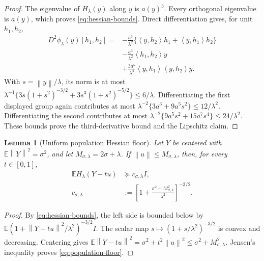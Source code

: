 \documentclass[twoside]{article}
\newtheorem{lemma}[theorem]{Lemma}
\theoremstyle{definition}
\newcommand{\E}{\mathbb E}
\newcommand{\norm}[1]{\left\lVert #1\right\rVert}
\newcommand{\ip}[2]{\left\langle #1,#2\right\rangle}
\begin{document}
\begin{proof}
The eigenvalue of $H_\lambda(y)$ along $y$ is $a(y)^3$. Every orthogonal eigenvalue is $a(y)$, which proves \eqref{eq:hessian-bounds}. Direct differentiation gives, for unit $h_1,h_2$,
\begin{align*}
D^2\phi_\lambda(y)[h_1,h_2]
={}&-\frac{a^3}{\lambda^2}
 \{\ip{y}{h_2}h_1+\ip{y}{h_1}h_2\}\\
&-\frac{a^3}{\lambda^2}\ip{h_1}{h_2}y\\
&+\frac{3a^5}{\lambda^4}\ip{y}{h_1}\ip{y}{h_2}y.
\end{align*}
With $s=\norm y/\lambda$, its norm is at most
$\lambda^{-1}\{3s(1+s^2)^{-3/2}+3s^3(1+s^2)^{-5/2}\}\le6/\lambda$.
Differentiating the first displayed group again contributes at most $\lambda^{-2}\{3a^3+9a^5s^2\}\le12/\lambda^2$. Differentiating the second contributes at most $\lambda^{-2}\{9a^5s^2+15a^7s^4\}\le24/\lambda^2$. These bounds prove the third-derivative bound and the Lipschitz claim.
\end{proof}

\begin{lemma}[Uniform population Hessian floor]\label{lem:population-floor}
Let $Y$ be centered with $\E\norm Y^2=\sigma^2$, and let
$M_{\sigma,\lambda}=2\sigma+\lambda$. If $\norm u\le M_{\sigma,\lambda}$, then, for every $t\in[0,1]$,
\begin{equation}\label{eq:population-floor}
\begin{aligned}
    \E H_\lambda(Y-tu)&\succeq c_{\sigma,\lambda}I,\\
    c_{\sigma,\lambda}
    &:=\left[1+\frac{\sigma^2+M_{\sigma,\lambda}^2}{\lambda^2}\right]^{-3/2}.
\end{aligned}
\end{equation}
\end{lemma}

\begin{proof}
By \eqref{eq:hessian-bounds}, the left side is bounded below by $\E(1+\norm{Y-tu}^2/\lambda^2)^{-3/2}I$. The scalar map $s\mapsto(1+s/\lambda^2)^{-3/2}$ is convex and decreasing. Centering gives $\E\norm{Y-tu}^2=\sigma^2+t^2\norm u^2\le\sigma^2+M_{\sigma,\lambda}^2$. Jensen's inequality proves \eqref{eq:population-floor}.
\end{proof}
\end{document}
